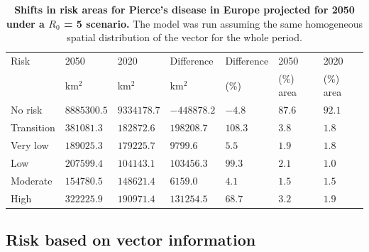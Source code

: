     \begin{table}[t!]
        \centering
        \caption{\textbf{Shifts in risk areas for Pierce's disease in Europe
                projected
                for 2050 under a $R_0$ = 5 scenario.} The model was run
            assuming the same
            homogeneous spatial distribution of the vector for the whole
            period.}
        \begin{tabular*}{\hsize}{@{\extracolsep{\fill}}lllllll}
            \hline
            Risk & 2050 & 2020 & Difference & Difference & 2050 & 2020 \\
            & km$^2$ & km$^2$ & km$^2$ & (\%) & (\%) area & (\%) area \\
            \hline
            No risk & $8885300.5$ & $9334178.7
            $ & $-448878.2
            $ & $-4.8
            $ & $87.6
            $ & $92.1
            $ \\
            Transition & $381081.3$
            & $182872.6$ & $198208.7$ & $108.3$ & $3.8$ & $1.8$ \\
            Very low & $189025.3$ & $179225.7
            $ & $9799.6$ & $5.5$ & $1.9$ & $1.8$ \\
            Low & $207599.4$ & $104143.1$ & $103456.3$ & $99.3$ & $2.1$ & $1.0$
            \\
            Moderate & $154780.5$ & $148621.4$ & $6159.0$ & $4.1$ & $1.5$ &
            $1.5$ \\
            High & $322225.9$ & $190971.4$ & $131254.5$ & $68.7$ & $3.2$ & $1.9
            $ \\
            \hline
        \end{tabular*}
        \label{table2}
    \end{table}

    \subsection{Risk based on vector information}

